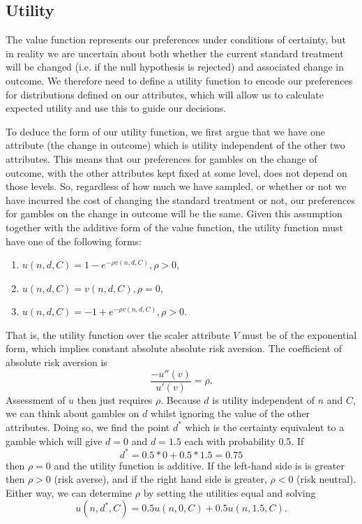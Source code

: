 \documentclass[sagev]{sagej}
\begin{document}
\subsection{Utility}

The value function represents our preferences under conditions of certainty, but in reality we are uncertain about both whether the current standard treatment will be changed (i.e. if the null hypothesis is rejected) and associated change in outcome. We therefore need to define a utility function to encode our preferences for distributions defined on our attributes, which will allow us to calculate expected utility and use this to guide our decisions. 

To deduce the form of our utility function, we first argue that we have one attribute (the change in outcome) which is utility independent of the other two attributes. This means that our preferences for gambles on the change of outcome, with the other attributes kept fixed at some level, does not depend on those levels. So, regardless of how much we have sampled, or whether or not we have incurred the cost of changing the standard treatment or not, our preferences for gambles on the change in outcome will be the same. Given this assumption together with the additive form of the value function, the utility function must have one of the following forms:

\begin{enumerate}
\item $u(n, d, C) = 1 - e^{-\rho v(n, d, C)}, \rho > 0$,
\item $u(n, d, C) = v(n, d, C), \rho = 0$,
\item $u(n, d, C) = -1 + e^{-\rho v(n, d, C)}, \rho > 0$.
\end{enumerate}

That is, the utility function over the scaler attribute $V$ must be of the exponential form, which implies constant absolute absolute risk aversion. The coefficient of absolute risk aversion is
$$
\frac{-u''(v)}{u'(v)} = \rho.
$$
Assessment of $u$ then just requires $\rho$. Because $d$ is utility independent of $n$ and $C$, we can think about gambles on $d$ whilst ignoring the value of the other attributes. Doing so, we find the point $d^*$ which is the certainty equivalent to a gamble which will give $d = 0$ and $d = 1.5$ each with probability 0.5. If
$$
d^* = 0.5 * 0 + 0.5 * 1.5 = 0.75
$$
then $\rho = 0$ and the utility function is additive. If the left-hand side is is greater then $\rho > 0$ (risk averse), and if the right hand side is greater, $\rho < 0$ (risk neutral). Either way, we can determine $\rho$ by setting the utilities equal and solving
$$
u(n, d^*, C) = 0.5 u(n, 0, C) + 0.5 u(n, 1.5, C).
$$
\end{document}
